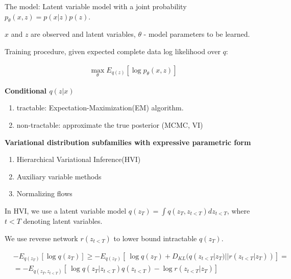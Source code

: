 \documentclass{article}
\begin{document}

The model:
Latent variable model with a joint probability $ p_{\theta}(x, z) = p(x|z)p(z)$.

$x$ and $z$ are observed and latent variables, $\theta$ - model parameters to be learned.

Training procedure, given expected complete data log likelihood over $q$:

\begin{align*}
    \max_{\theta}E_{q(z)} [\log p_{\theta}(x, z)]
\end{align*}

\textbf{Conditional $q(z|x)$}
\begin{enumerate}{}
    \item tractable: Expectation-Maximization(EM) algorithm.
    \item non-tractable: approximate the true posterior (MCMC, VI)
\end{enumerate}




\textbf{Variational distribution subfamilies with expressive parametric form}
\begin{enumerate}
    \item Hierarchical Variational Inference(HVI) 
    \item Auxiliary variable methods
    \item Normalizing flows
\end{enumerate}

In HVI, we use a latent variable model $q(z_T) = \int q(z_T, z_{t<T}) d z_{t < T} $, where $t < T$ denoting latent variables.

We use reverse network $r(z_{t < T} )$ to lower bound intractable $q(z_T)$.

\begin{align*}
    &- E_{q(z_T)}[\log q(z_T)] \ge -E_{q(z_T)}[\ 
    \log q(z_T) + D_{KL}(q(z_{t<T} | z_T) || r(z_{t<T} | z_T))] = \\
    &= -E_{q(z_T, z_{t<T})}[\ 
    \log q(z_T | z_{t<T}) q(z_{t<T}) - \log r(z_{t<T} | z_T) ]
\end{align*}
\end{document}
